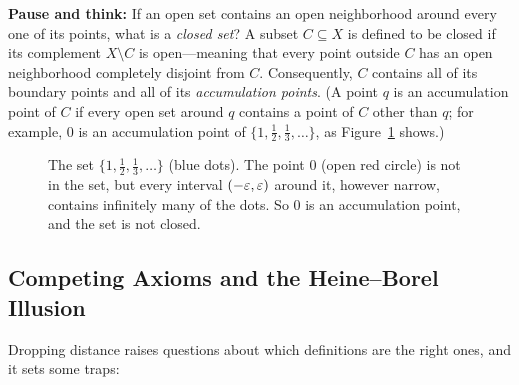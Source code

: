 \begin{recoverybox}
\textbf{Pause and think:} If an open set contains an open neighborhood around every one of its points, what is a \emph{closed set}?
A subset $C \subseteq X$ is defined to be closed if its complement $X \setminus C$ is open---meaning that every point outside $C$ has an open neighborhood completely disjoint from $C$. Consequently, $C$ contains all of its boundary points and all of its \emph{accumulation points}. (A point $q$ is an accumulation point of $C$ if every open set around $q$ contains a point of $C$ other than $q$; for example, $0$ is an accumulation point of $\{1, \tfrac12, \tfrac13, \dots\}$, as Figure~\ref{37:fig-accumulation} shows.)
\end{recoverybox}

\begin{figure}[htbp]
\centering
{}
\caption{The set $\{1, \tfrac12, \tfrac13, \dots\}$ (blue dots). The point $0$ (open red circle) is not in the set, but every interval $(-\varepsilon, \varepsilon)$ around it, however narrow, contains infinitely many of the dots. So $0$ is an accumulation point, and the set is not closed.}\label{37:fig-accumulation}
\end{figure}

\subsection{Competing Axioms and the Heine--Borel Illusion}

Dropping distance raises questions about which definitions are the right ones, and it sets some traps:

